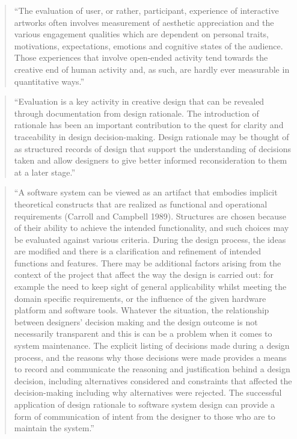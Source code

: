 \begin{quote}
  ``The evaluation of user, or rather, participant, experience of interactive artworks often involves measurement of aesthetic appreciation and the various engagement qualities which are dependent on personal traits, motivations, expectations, emotions and cognitive states of the audience. Those experiences that involve open-ended activity tend towards the creative end of human activity and, as such, are hardly ever measurable in quantitative ways.''  \citep[p.8]{Candy2012}
\end{quote}

\begin{quote}
  ``Evaluation is a key activity in creative design that can be revealed through documentation from design rationale. The introduction of rationale has been an important contribution to the quest for clarity and traceability in design decision-making. Design rationale may be thought of as structured records of design that support the understanding of decisions taken and allow designers to give better informed reconsideration to them at a later stage.'' \citep[p.9]{Candy2012}
\end{quote}

\begin{quote}
  ``A software system can be viewed as an artifact that embodies implicit theoretical constructs that are realized as functional and operational requirements (Carroll and Campbell 1989). Structures are chosen because of their ability to achieve the intended functionality, and such choices may be evaluated against various criteria. During the design process, the ideas are modified and there is a clarification and refinement of intended functions and features. There may be additional factors arising from the context of the project that affect the way the design is carried out: for example the need to keep sight of general applicability whilst meeting the domain specific requirements, or the influence of the given hardware platform and software tools. Whatever the situation, the relationship between designers' decision making and the design outcome is not necessarily transparent and this is can be a problem when it comes to system maintenance. The explicit listing of decisions made during a design process, and the reasons why those decisions were made provides a means to record and communicate the reasoning and justification behind a design decision, including alternatives considered and constraints that affected the decision-making including why alternatives were rejected. The successful application of design rationale to software system design can provide a form of communication of intent from the designer to those who are to maintain the system.'' \citep[p.9]{Candy2012}
\end{quote}

